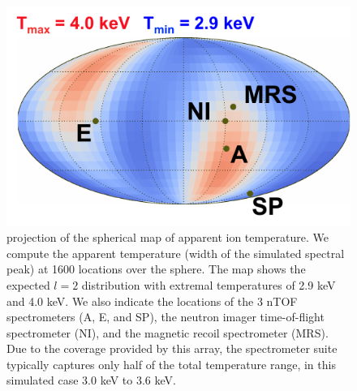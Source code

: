 \documentclass[aip,pop,numerical,reprint,floatfix]{revtex4-1}
\begin{document}
\begin{figure}[h]
\begin{centering}
\includegraphics[width=0.8\columnwidth]{tion_map}
\par\end{centering}

\caption{\label{fig:tion_map}projection of the spherical map of apparent ion temperature. We compute the apparent temperature (width of the simulated spectral peak) at 1600 locations over the sphere. The map shows the expected $l=2$ distribution with extremal temperatures of 2.9 keV and 4.0 keV. We also indicate the locations of the 3 nTOF spectrometers (A, E, and SP), the neutron imager time-of-flight spectrometer (NI), and the magnetic recoil spectrometer (MRS). Due to the coverage provided by this array, the spectrometer suite typically captures only half of the total temperature range, in this simulated case 3.0 keV to 3.6 keV.}
\end{figure}
\end{document}
